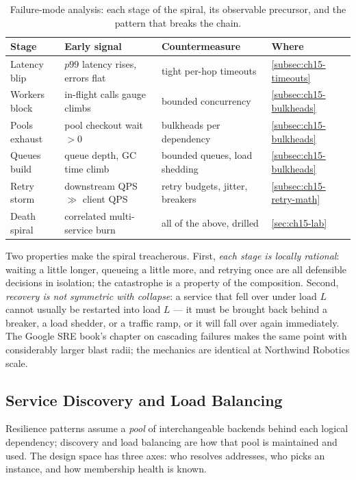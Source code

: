 \begin{table}[h]
  \centering
  \small
  \begin{tabularx}{\textwidth}{l X X l}
    \toprule
    \textbf{Stage} & \textbf{Early signal} & \textbf{Countermeasure} & \textbf{Where} \\
    \midrule
    Latency blip & $p99$ latency rises, errors flat & tight per-hop timeouts & \ref{subsec:ch15-timeouts} \\
    Workers block & in-flight calls gauge climbs & bounded concurrency & \ref{subsec:ch15-bulkheads} \\
    Pools exhaust & pool checkout wait $> 0$ & bulkheads per dependency & \ref{subsec:ch15-bulkheads} \\
    Queues build & queue depth, GC time climb & bounded queues, load shedding & \ref{subsec:ch15-bulkheads} \\
    Retry storm & downstream QPS $\gg$ client QPS & retry budgets, jitter, breakers & \ref{subsec:ch15-retry-math} \\
    Death spiral & correlated multi-service burn & all of the above, drilled & \ref{sec:ch15-lab} \\
    \bottomrule
  \end{tabularx}
  \caption{Failure-mode analysis: each stage of the spiral, its observable
  precursor, and the pattern that breaks the chain.}
  \label{tab:ch15-failure-modes}
\end{table}

Two properties make the spiral treacherous. First, \emph{each stage is
locally rational}: waiting a little longer, queueing a little more, and
retrying once are all defensible decisions in isolation; the catastrophe is
a property of the composition. Second, \emph{recovery is not symmetric with
collapse}: a service that fell over under load $L$ cannot usually be
restarted into load $L$ --- it must be brought back behind a breaker, a
load shedder, or a traffic ramp, or it will fall over again immediately.
The Google SRE book's chapter on cascading failures makes the same point
with considerably larger blast radii; the mechanics are identical at
Northwind Robotics scale.

\subsection{Service Discovery and Load Balancing}
\label{subsec:ch15-discovery}

Resilience patterns assume a \emph{pool} of interchangeable backends behind
each logical dependency; discovery and load balancing are how that pool is
maintained and used. The design space has three axes: who resolves
addresses, who picks an instance, and how membership health is known.

